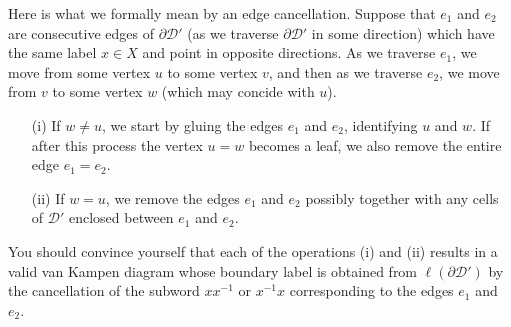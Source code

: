 \documentclass[12pt]{amsart}
\begin{document}
Here is what we formally mean by an edge cancellation. Suppose that $e_1$ and $e_2$
are consecutive edges of $\partial \mathcal D'$ (as we traverse $\partial \mathcal D'$ in some direction) which have the same label $x\in X$ and point in opposite directions.
As we traverse $e_1$, we move from some vertex $u$ to some vertex $v$, and then
as we traverse $e_2$, we move from $v$ to some vertex $w$ (which may concide with $u$).

\begin{itemize}
\item[(i)] If $w\neq u$, we start by gluing the edges $e_1$ and $e_2$, identifying 
$u$ and $w$. If after this process the vertex $u=w$ becomes a leaf, we also remove the entire edge $e_1=e_2$.
\item[(ii)] If $w=u$, we remove the edges $e_1$ and $e_2$ possibly together with any cells of $\mathcal D'$ enclosed between $e_1$ and $e_2$.
\end{itemize}
You should convince yourself that each of the operations (i) and (ii) results in a valid van Kampen diagram whose boundary label is obtained from $\ell(\partial \mathcal D')$
by the cancellation of the subword $x x^{-1}$ or $x^{-1} x$ corresponding to the edges
$e_1$ and $e_2$.
\end{document}
